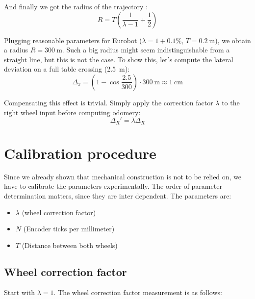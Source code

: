 \documentclass[a4paper]{paper}
\begin{document}
And finally we got the radius of the trajectory :
\begin{equation*}
    R = T \left(\frac{1}{\lambda - 1}  + \frac{1}{2}\right)
\end{equation*}

Plugging reasonable parameters for Eurobot ($\lambda=1+0.1\%$, $T = \SI{0.2}{\meter}$), we obtain a radius $R = \SI{300}{\meter}$. 
Such a big radius might seem indistinguishable from a straight line, but this is not the case.
To show this, let's compute the lateral deviation on a full table crossing (\SI{2.5}{\meter}):
\begin{equation*}
    \Delta_x = \left( 1 - \cos \frac{2.5}{300} \right) \cdot \SI{300}{\meter} \approx \SI{1}{\centi\meter}
\end{equation*}


Compensating this effect is trivial.
Simply apply the correction factor $\lambda$ to the right wheel input before computing odomery:
\begin{equation}
    \Delta_R' = \lambda \Delta_R
\end{equation}

\section{Calibration procedure}
Since we already shown that mechanical construction is not to be relied on, we have to calibrate the parameters experimentally.
The order of parameter determination matters, since they are inter dependent.
The parameters are:
\begin{itemize}
    \item $\lambda$ (wheel correction factor)
    \item $N$ (Encoder ticks per millimeter)
    \item $T$ (Distance between both wheels)
\end{itemize}

\subsection{Wheel correction factor}
Start with $\lambda=1$.
The wheel correction factor measurement is as follows:
\end{document}
